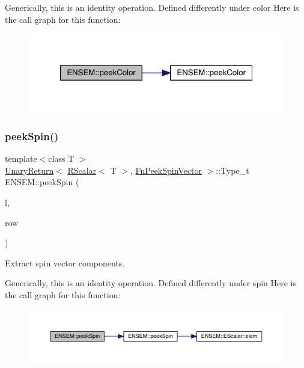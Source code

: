 Generically, this is an identity operation. Defined differently under color Here is the call graph for this function\+:\nopagebreak
\begin{figure}[H]
\begin{center}
\leavevmode
\includegraphics[width=321pt]{d9/ded/group__rscalar_ga692303fb1e668f95b9363df896b04842_cgraph}
\end{center}
\end{figure}
\mbox{\label{group__rscalar_gae91157ec10379f83a648e992a01ce0c6}} 
\subsubsection{\texorpdfstring{peekSpin()}{peekSpin()}\hspace{0.1cm}{\footnotesize\ttfamily [1/2]}}
{\footnotesize\ttfamily template$<$class T $>$ \\
\mbox{\hyperlink{structENSEM_1_1UnaryReturn}{Unary\+Return}}$<$ \mbox{\hyperlink{classENSEM_1_1RScalar}{R\+Scalar}}$<$ T $>$, \mbox{\hyperlink{structENSEM_1_1FnPeekSpinVector}{Fn\+Peek\+Spin\+Vector}} $>$\+::Type\+\_\+t E\+N\+S\+E\+M\+::peek\+Spin (\begin{DoxyParamCaption}\item[{const \mbox{\hyperlink{classENSEM_1_1RScalar}{R\+Scalar}}$<$ T $>$ \&}]{l,  }\item[{int}]{row }\end{DoxyParamCaption})\hspace{0.3cm}{\ttfamily [inline]}}



Extract spin vector components. 

Generically, this is an identity operation. Defined differently under spin Here is the call graph for this function\+:\nopagebreak
\begin{figure}[H]
\begin{center}
\leavevmode
\includegraphics[width=350pt]{d9/ded/group__rscalar_gae91157ec10379f83a648e992a01ce0c6_cgraph}
\end{center}
\end{figure}
\mbox{\label{group__rscalar_gafc1d2e7916b4f394f3c5aa75ce62b421}} 
